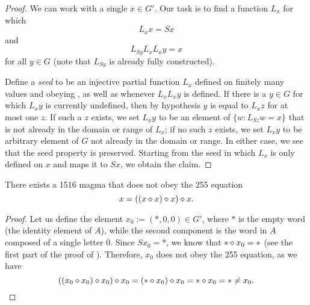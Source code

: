 \begin{proof}  We can work with a single $x \in G'$.  Our task is to find a function $L_x$ for which
\begin{equation}\label{axioma-again}
   L_x x = Sx
\end{equation}
and
\begin{equation}\label{axiomb-again}
  L_{Sy} L_x L_x y = x
\end{equation}
for all $y \in G$ (note that $L_{Sy}$ is already fully constructed).

Define a \emph{seed} to be an injective partial function $L_x$ defined on finitely many values and obeying , as well as  whenever $L_x L_x y$ is defined.  If there is a $y \in G$ for which $L_x y$ is currently undefined, then by hypothesis $y$ is equal to $L_x z$ for at most one $z$.  If such a $z$ exists, we set $L_x y$ to be an element of $\{ w: L_{Sz} w = x \}$ that is not already in the domain or range of $L_x$; if no such $z$ exists, we set $L_x y$ to be arbitrary element of $G$ not already in the domain or range.  In either case, we see that the seed property is preserved.  Starting from the seed in which $L_x$ is only defined on $x$ and maps it to $Sx$, we obtain the claim.
\end{proof}

\begin{corollary}\label{1516-no-255}  There exists a 1516 magma that does not obey the 255 equation $$x = ((x \diamond x) \diamond x) \diamond x.$$
\end{corollary}

\begin{proof}
  Let us define the element $x_0 := (*, 0, 0) \in G'$, where $*$ is the empty word (the identity element of $A$), while the second component is the word in $A$ composed of a single letter $0$.
  Since $S x_0 = *$, we know that $* \diamond x_0 = *$ (see the first part of the proof of ).
  Therefore, $x_0$ does not obey the 255 equation, as we have
  $$((x_0 \diamond x_0) \diamond x_0) \diamond x_0 = (* \diamond x_0) \diamond x_0 = * \diamond x_0 = * \neq x_0.$$
\end{proof}
